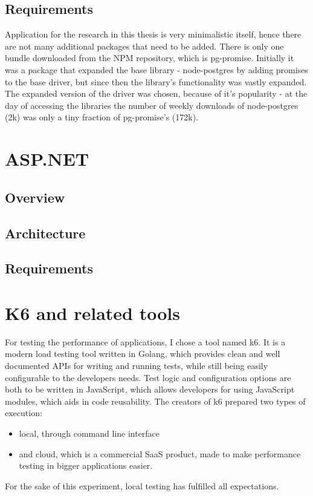 \subsection{Requirements}
Application for the research in this thesis is very minimalistic itself, hence there are not many additional packages that need to be added. There is only one bundle downloaded from the NPM repository, which is pg-promise. Initially it was a package that expanded the base library - node-postgres by adding promises to the base driver, but since then the library's functionality was vastly expanded. %
The expanded version of the driver was chosen, because of it's popularity - at the day of accessing the libraries the number of weekly downloads of node-postgres (2k) was only a tiny fraction of pg-promise's (172k). %

\section{ASP.NET}

\subsection{Overview}
\subsection{Architecture}
\subsection{Requirements}

\section{K6 and related tools}

For testing the performance of applications, I chose a tool named k6. It is a modern load testing tool written in Golang, which provides clean and well documented APIs for writing and running tests, while still being easily configurable to the developers needs. Test logic and configuration options are both to be written in JavaScript, which allows developers for using JavaScript modules, which aids in code reusability. The creators of k6 prepared two types of execution:
\begin{itemize}
    \item local, through command line interface
    \item and cloud, which is a commercial SaaS product, made to make performance testing in bigger applications easier.
\end{itemize}
For the sake of this experiment, local testing has fulfilled all expectations.

